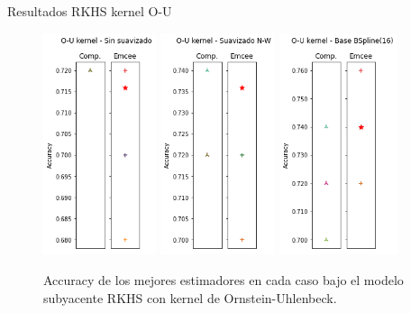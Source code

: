 \documentclass[10pt, professionalfonts]{beamer}
\begin{document}
\begin{frame}{Resultados RKHS kernel O-U}
  \begin{figure}
    \includegraphics[width=0.295\textwidth]{img/results-new/clf_rkhs_ou_none}\hfill
    \includegraphics[width=0.3\textwidth]{img/results-new/clf_rkhs_ou_nw}\hfill
    \includegraphics[width=0.31\textwidth]{img/results-new/clf_rkhs_ou_basis}
    \caption{Accuracy de los mejores estimadores en cada caso bajo el modelo subyacente RKHS con kernel de Ornstein-Uhlenbeck.}
  \end{figure}
\end{frame}
\end{document}
